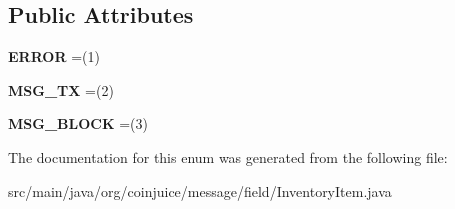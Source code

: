 \subsection*{Public Attributes}
\begin{DoxyCompactItemize}
\item 
\hypertarget{enumorg_1_1coinjuice_1_1message_1_1field_1_1_inventory_item_1_1_object_type_a47f8853a5340cc97d6eb1b5cb9422acd}{{\bfseries E\-R\-R\-O\-R} =(1)}\label{enumorg_1_1coinjuice_1_1message_1_1field_1_1_inventory_item_1_1_object_type_a47f8853a5340cc97d6eb1b5cb9422acd}

\item 
\hypertarget{enumorg_1_1coinjuice_1_1message_1_1field_1_1_inventory_item_1_1_object_type_a918958c4617bcfe8ac9efb571ecb4a09}{{\bfseries M\-S\-G\-\_\-\-T\-X} =(2)}\label{enumorg_1_1coinjuice_1_1message_1_1field_1_1_inventory_item_1_1_object_type_a918958c4617bcfe8ac9efb571ecb4a09}

\item 
\hypertarget{enumorg_1_1coinjuice_1_1message_1_1field_1_1_inventory_item_1_1_object_type_a46dc787da17cc062601b1e48f71f1519}{{\bfseries M\-S\-G\-\_\-\-B\-L\-O\-C\-K} =(3)}\label{enumorg_1_1coinjuice_1_1message_1_1field_1_1_inventory_item_1_1_object_type_a46dc787da17cc062601b1e48f71f1519}

\end{DoxyCompactItemize}


The documentation for this enum was generated from the following file\-:\begin{DoxyCompactItemize}
\item 
src/main/java/org/coinjuice/message/field/Inventory\-Item.\-java\end{DoxyCompactItemize}
